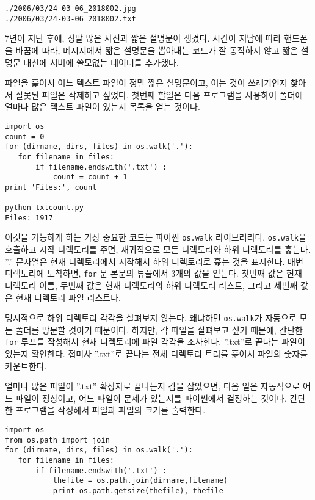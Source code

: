 \beforeverb
\begin{verbatim}
./2006/03/24-03-06_2018002.jpg
./2006/03/24-03-06_2018002.txt
\end{verbatim}
\afterverb
%

7년이 지난 후에, 정말 많은 사진과 짧은 설명문이 생겼다. 시간이 지남에 따라 핸드폰을 바꿈에 따라,
메시지에서 짧은 설명문을 뽑아내는 코드가 잘 동작하지 않고 짧은 설명문 대신에 서버에 쓸모없는 데이터를 추가했다.

파일을 훑어서 어느 텍스트 파일이 정말 짧은 설명문이고, 어는 것이 쓰레기인지 찾아서 잘못된 파일은 
삭제하고 싶었다. 첫번째 할일은 다음 프로그램을 사용하여 폴더에 얼마나 많은 텍스트 파일이 있는지 목록을 얻는 것이다.

\beforeverb
\begin{verbatim}
import os
count = 0
for (dirname, dirs, files) in os.walk('.'):
   for filename in files:
       if filename.endswith('.txt') :
           count = count + 1
print 'Files:', count

python txtcount.py
Files: 1917
\end{verbatim}
\afterverb
%

이것을 가능하게 하는 가장 중요한 코드는 파이썬 {\tt os.walk} 라이브러리다.
{\tt os.walk}을 호출하고 시작 디렉토리를 주면, 재귀적으로 모든 디렉토리와 하위 디렉토리를 훑는다.
''.'' 문자열은 현재 디렉토리에서 시작해서 하위 디렉토리로 훑는 것을 표시한다.
매번 디렉토리에 도착하면, {\tt for} 문 본문의 튜플에서 3개의 값을 얻는다.
첫번째 값은 현재 디렉토리 이름, 두번째 값은 현재 디렉토리의 하위 디렉토리 리스트, 그리고 세번째 값은
현재 디렉토리 파일 리스트다.

명시적으로 하위 디렉토리 각각을 살펴보지 않는다. 왜냐하면
{\tt os.walk}가 자동으로 모든 폴더를 방문할 것이기 때문이다.
하지만, 각 파일을 살펴보고 싶기 때문에, 간단한 {\tt for} 루프를 작성해서 현재 디렉토리에 
파일 각각을 조사한다. ''.txt''로 끝나는 파일이 있는지 확인한다.
접미사 ''.txt''로 끝나는 전체 디렉토리 트리를 훑어서 파일의 숫자를 카운트한다.

얼마나 많은 파일이 ''.txt'' 확장자로 끝나는지 감을 잡았으면, 다음 일은 자동적으로
어느 파일이 정상이고, 어느 파일이 문제가 있는지를 파이썬에서 결정하는 것이다.
간단한 프로그램을 작성해서 파일과 파일의 크기를 출력한다.

\beforeverb
\begin{verbatim}
import os
from os.path import join
for (dirname, dirs, files) in os.walk('.'):
   for filename in files:
       if filename.endswith('.txt') :
           thefile = os.path.join(dirname,filename)
           print os.path.getsize(thefile), thefile
\end{verbatim}
\afterverb
%

